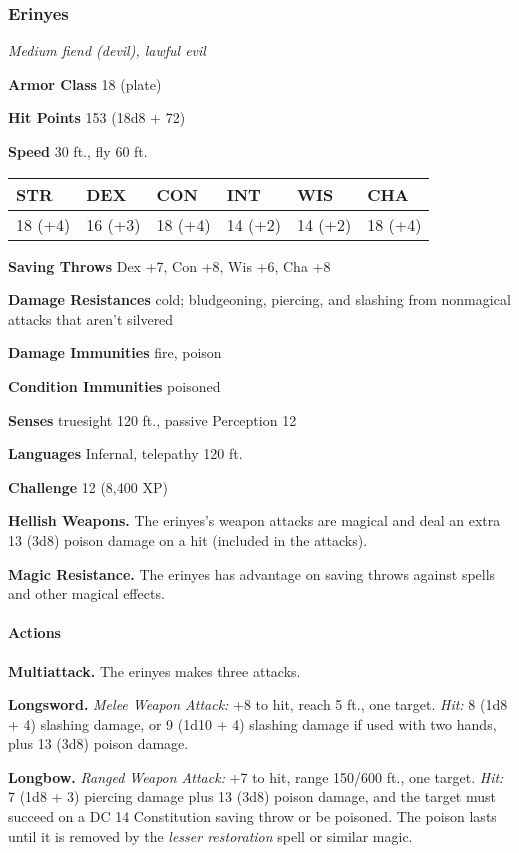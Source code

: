 \documentclass[
]{article}
\begin{document}
\hypertarget{erinyes}{%
\subsubsection{Erinyes}\label{erinyes}}

\emph{Medium fiend (devil), lawful evil}

\textbf{Armor Class} 18 (plate)

\textbf{Hit Points} 153 (18d8 + 72)

\textbf{Speed} 30 ft., fly 60 ft.

\begin{longtable}[]{@{}llllll@{}}
\toprule
STR & DEX & CON & INT & WIS & CHA\tabularnewline
\midrule
\endhead
18 (+4) & 16 (+3) & 18 (+4) & 14 (+2) & 14 (+2) & 18 (+4)\tabularnewline
\bottomrule
\end{longtable}

\textbf{Saving Throws} Dex +7, Con +8, Wis +6, Cha +8

\textbf{Damage Resistances} cold; bludgeoning, piercing, and slashing
from nonmagical attacks that aren't silvered

\textbf{Damage Immunities} fire, poison

\textbf{Condition Immunities} poisoned

\textbf{Senses} truesight 120 ft., passive Perception 12

\textbf{Languages} Infernal, telepathy 120 ft.

\textbf{Challenge} 12 (8,400 XP)

\textbf{Hellish Weapons.} The erinyes's weapon attacks are magical and
deal an extra 13 (3d8) poison damage on a hit (included in the attacks).

\textbf{Magic Resistance.} The erinyes has advantage on saving throws
against spells and other magical effects.

\hypertarget{actions-13}{%
\paragraph{Actions}\label{actions-13}}

\textbf{Multiattack.} The erinyes makes three attacks.

\textbf{Longsword.} \emph{Melee Weapon Attack:} +8 to hit, reach 5 ft.,
one target. \emph{Hit:} 8 (1d8 + 4) slashing damage, or 9 (1d10 + 4)
slashing damage if used with two hands, plus 13 (3d8) poison damage.

\textbf{Longbow.} \emph{Ranged Weapon Attack:} +7 to hit, range 150/600
ft., one target. \emph{Hit:} 7 (1d8 + 3) piercing damage plus 13 (3d8)
poison damage, and the target must succeed on a DC 14 Constitution
saving throw or be poisoned. The poison lasts until it is removed by the
\emph{lesser restoration} spell or similar magic.
\end{document}
